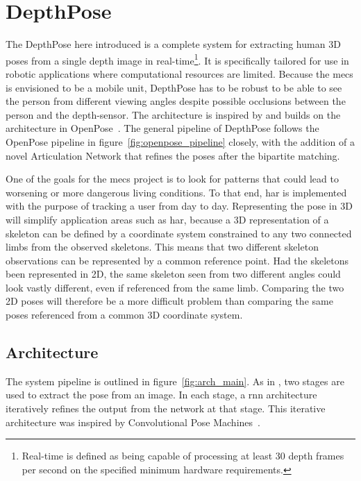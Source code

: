 \chapter{DepthPose}

The DepthPose here introduced is a complete system for extracting human 3D poses from a single depth image in real-time\footnote{Real-time is defined as being capable of processing at least 30 depth frames per second on the specified minimum hardware requirements.}. It is specifically tailored for use in robotic applications where computational resources are limited. Because the \gls{mecs} is envisioned to be a mobile unit, DepthPose has to be robust to be able to see the person from different viewing angles despite possible occlusions between the person and the depth-sensor. The architecture is inspired by and builds on the architecture in OpenPose~\cite{cao2019openpose}. The general pipeline of DepthPose follows the OpenPose pipeline in figure~\ref{fig:openpose_pipeline} closely, with the addition of a novel Articulation Network that refines the poses after the bipartite matching.

One of the goals for the \gls{mecs} project is to look for patterns that could lead to worsening or more dangerous living conditions. To that end, \gls{har} is implemented with the purpose of tracking a user from day to day. Representing the pose in 3D will simplify application areas such as \gls{har}, because a 3D representation of a skeleton can be defined by a coordinate system constrained to any two connected limbs from the observed skeletons. This means that two different skeleton observations can be represented by a common reference point. Had the skeletons been represented in 2D, the same skeleton seen from two different angles could look vastly different, even if referenced from the same limb. Comparing the two 2D poses will therefore be a more difficult problem than comparing the same poses referenced from a common 3D coordinate system.



\section{Architecture}

The system pipeline is outlined in figure~\ref{fig:arch_main}. As in \cite{cao2019openpose}, two stages are used to extract the pose from an image. In each stage, a \gls{rnn} architecture iteratively refines the output from the network at that stage. This iterative architecture was inspired by Convolutional Pose Machines~\cite{wei2016cpm}.


